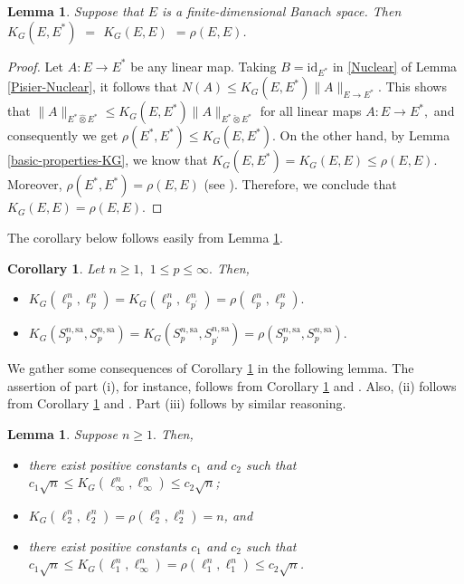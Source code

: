 \documentclass[a4paper,oneside,11pt, reqno]{amsart}
\numberwithin{equation}{section}
\newtheorem{lemma}[theorem]{Lemma}
\newtheorem{corollary}[theorem]{Corollary}
\theoremstyle{plain}
\begin{document}
\begin{lemma} \label{lem:4.2}
Suppose that $E$  is a finite-dimensional Banach space. Then $K_G(E,E^*)$ $=$ $K_G(E,E)$ $=\rho(E,E)$.
\end{lemma}
\begin{proof}
Let $A:E\to E^*$ be any linear map. Taking $B=\text{id}_{E^*}$ in \eqref{Nuclear} of Lemma \ref{Pisier-Nuclear}, it follows that $N(A)\leqslant K_G(E,E^*)\|A\|_{E\to E^*}.$
This shows that $\|A\|_{E^*\hat{\otimes}E^*}\leqslant K_G(E,E^*)\|A\|_{E^*\check{\otimes}E^*}$ for all linear maps $A:E\to E^*,$ and consequently we get $\rho(E^*,E^*)\leqslant K_G(E,E^*).$ 
On the other hand, by Lemma \ref{basic-properties-KG}, we know that $K_G(E,E^*)=K_G(E,E)\leqslant \rho(E,E)$. Moreover, $\rho(E^*,E^*)=\rho(E,E)$ (see \cite[Proposition 12]{XOR games and GT}). Therefore, we conclude that $K_G(E,E)=\rho(E,E).$ 
\end{proof}
The corollary below follows easily from Lemma \ref{lem:4.2}. 
\begin{corollary}\label{impcor}
Let $n\geqslant 1,$ $1\leqslant p\leqslant \infty.$ 
Then,
\begin{itemize}
\item[(i)]$
K_G(\ell_p^n,\ell_p^n)=K_G(\ell_p^n,\ell_{p^\prime}^n)=\rho(\ell_p^n,\ell_p^n).$
\item[(ii)]$
K_G(S_p^{n,\text{sa}},S_p^{n,\text{sa}})=K_G(S_p^{n,\text{sa}},S_{p^\prime}^{n,\text{sa}})=\rho(S_p^{n,\text{sa}},S_p^{n,\text{sa}}).$
\end{itemize}
\end{corollary}
We gather some consequences of Corollary \ref{impcor} in the following lemma. 
The assertion of part (i), for instance, follows from Corollary \ref{impcor} and \cite[Page 697]{XOR games and GT}. Also, (ii) follows from Corollary \ref{impcor} and \cite[Proposition 12]{XOR games and GT}. Part (iii) follows by similar reasoning.
\begin{lemma}\label{prefin}
Suppose $n\geqslant 1.$ Then,
\begin{itemize}
\item[(i)] there exist positive constants $c_1$ and $c_2$ such that $c_1\sqrt{n}\leqslant K_G(\ell_\infty^n,\ell_\infty^n)\leqslant c_2\sqrt{n}$;
\item[(ii)] $K_G(\ell_2^n,\ell_2^n)=\rho(\ell_2^n,\ell_2^n)=n$, and 
\item[(iii)] there exist positive constants $c_1$ and $c_2$ such that $c_1\sqrt{n}\leqslant K_G(\ell_1^n,\ell_\infty^n)=\rho(\ell_1^n,\ell_1^n)\leqslant c_2\sqrt{n}$.
\end{itemize}
\end{lemma}
\end{document}
